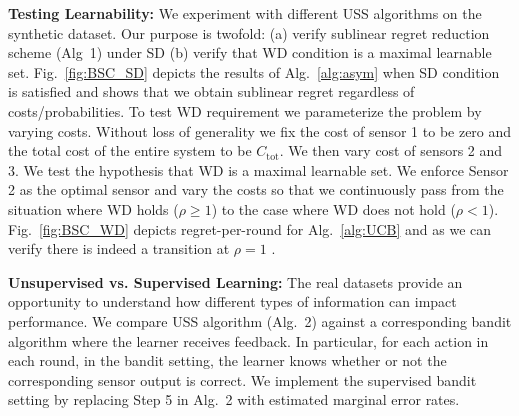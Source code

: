 \vspace{-1.5cm}
\noindent
{\bf Testing Learnability:}
We experiment with different USS algorithms on the synthetic dataset. Our purpose is twofold: (a) verify sublinear regret reduction scheme (Alg~1) under SD (b) verify that WD condition is a maximal learnable set. 
Fig.~\ref{fig:BSC_SD} depicts the results of Alg.~\ref{alg:asym} when SD condition is satisfied and shows that we obtain sublinear regret regardless of costs/probabilities. To test WD requirement we parameterize the problem by varying costs. Without loss of generality we fix the cost of sensor 1 to be zero and the total cost of the entire system to be $C_{\mbox{tot}}$. We then vary cost of sensors 2 and 3. %
We test the hypothesis that WD is a maximal learnable set. We enforce Sensor 2 as the optimal sensor and vary the costs so that we continuously pass from the situation where WD holds ($\rho \geq 1$) to the case where WD does not hold ($\rho < 1$). %
Fig.~\ref{fig:BSC_WD} depicts regret-per-round for Alg.~\ref{alg:UCB} and as we can verify there is indeed a transition at $\rho = 1$ . %

\noindent
{\bf Unsupervised vs. Supervised Learning:}
The real datasets provide an opportunity to understand how different types of information can impact performance. We compare USS algorithm (Alg.~2) against a corresponding bandit algorithm where the learner receives feedback. In particular, for each action in each round, in the bandit setting, the learner knows whether or not the corresponding sensor output is correct. We implement the supervised bandit setting by replacing Step 5 in Alg.~2 with estimated marginal error rates. 

